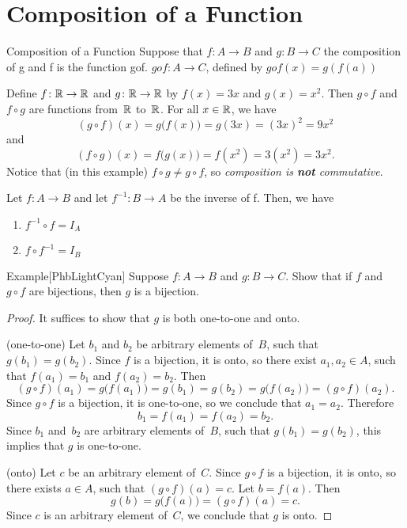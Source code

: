 \documentclass[../MATH-2000-Notes.tex]{subfiles}
\begin{document}
\section{Composition of a Function}
\begin{Definition}
    {Composition of a Function}
    Suppose that \(f: A\rightarrow B\) and \(g: B \rightarrow C\) the composition of g and f is the function gof. \(gof: A \rightarrow C\), defined by \(gof(x) = g(f(a))\)
\end{Definition}
Define $f \colon \mathbb{R} \to \mathbb{R}$ and $g \colon \mathbb{R} \to \mathbb{R}$ by
$f(x) = 3x$ and $g(x) = x^2$. Then $g \circ f$ and $f \circ g$ are functions from~$\mathbb{R}$ to~$\mathbb{R}$. For all $x \in \mathbb{R}$, we have
$$(g \circ f)(x) = g \bigl( f(x) \bigr) = g(3x) =(3x)^2 =  9x^2 $$
and
$$(f \circ g)(x) = f \bigl( g(x) \bigr) = f(x^2) = 3(x^2) = 3x^2 .$$
Notice that (in this example) $f \circ g \neq g \circ f$, so \emph{composition is \textbf{not} commutative}.

\begin{Proposition}
    {}
    Let \(f: A \rightarrow B\) and let \(f^{-1}: B \rightarrow A\) be the inverse of f. Then, we have \begin{enumerate}
        \item \(f^{-1} \circ f = I_A\)
        \item \(f \circ f^{-1} = I_B\)
    \end{enumerate}
\end{Proposition}

\begin{commentbox}{Example}[{PhbLightCyan}]\label{ComposegBijEg}
    Suppose $f \colon A \to B$ and $g \colon B \to C$. Show that if $f$ and $g \circ f$ are bijections, then $g$ is a bijection.
\end{commentbox}

\begin{proof}
    It suffices to show that $g$ is both one-to-one and onto.

    (one-to-one) Let $b_1$ and $b_2$ be arbitrary elements of~$B$, such that $g(b_1) = g(b_2)$. Since $f$ is a bijection, it is onto, so there exist $a_1,a_2 \in A$, such that $f(a_1) = b_1$ and $f(a_2) = b_2$. Then
    $$ (g\circ f)(a_1) = g\bigl( f(a_1) \bigr) = g(b_1) = g(b_2) =g \bigl( f(a_2) \bigr) = (g \circ f)(a_2) .$$
    Since $g \circ f$ is a bijection, it is one-to-one, so we conclude that $a_1 = a_2$. Therefore
    $$ b_1 = f(a_1) = f(a_2) = b_2 .$$
    Since $b_1$ and~$b_2$ are arbitrary elements of~$B$, such that $g(b_1) = g(b_2)$, this implies that $g$ is one-to-one.

    (onto) Let $c$ be an arbitrary element of~$C$. Since $g \circ f$ is a bijection, it is onto, so there exists $a \in A$, such that $(g \circ f)(a) = c$. Let $b = f(a)$. Then
    $$ g(b) = g \bigl( f(a) \bigr) = (g \circ f)(a) = c .$$
    Since $c$ is an arbitrary element of~$C$, we conclude that $g$ is onto.
\end{proof}
\end{document}
